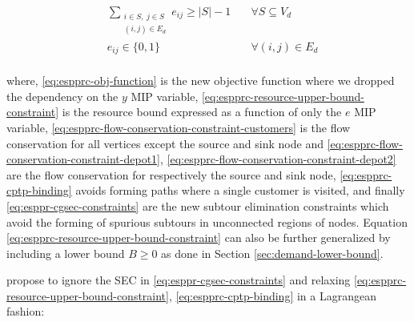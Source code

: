 \begin{align}
	                                & \sum_{\substack{i \in S,\ j \in S                                                                                                                                                          \\ (i, j) \in E_d}} e_{ij} \ge |S| - 1                                                                   & \quad \forall S \subseteq V_d \label{eq:esppr-cgsec-constraints} \\
	                                & e_{ij}                   \in \lbrace 0, 1 \rbrace                                                          & \quad \forall (i, j) \in E_d               \label{eq:espprc-e-mip-var-bounds} \\
\end{align}

where, \eqref{eq:espprc-obj-function} is the new objective function where we dropped the dependency on the $y$ MIP variable,
\eqref{eq:espprc-resource-upper-bound-constraint} is the resource bound expressed as a function of only the $e$ MIP variable,
\eqref{eq:espprc-flow-conservation-constraint-customers} is the flow conservation for all vertices except the source and sink node
and \eqref{eq:espprc-flow-conservation-constraint-depot1}, \eqref{eq:espprc-flow-conservation-constraint-depot2} are the flow conservation for respectively the source and sink node,
\eqref{eq:espprc-cptp-binding} avoids forming paths where a single customer is visited,
and finally \eqref{eq:esppr-cgsec-constraints} are the new subtour elimination constraints which avoid the forming of spurious subtours in unconnected regions of nodes.
Equation \eqref{eq:espprc-resource-upper-bound-constraint} can also be further generalized by including a lower bound $B \ge 0$ as done in Section \ref{sec:demand-lower-bound}.

\cite{beasley1989algorithm} propose to ignore the SEC in \eqref{eq:esppr-cgsec-constraints} and relaxing \eqref{eq:espprc-resource-upper-bound-constraint}, \eqref{eq:espprc-cptp-binding} in a Lagrangean fashion:

